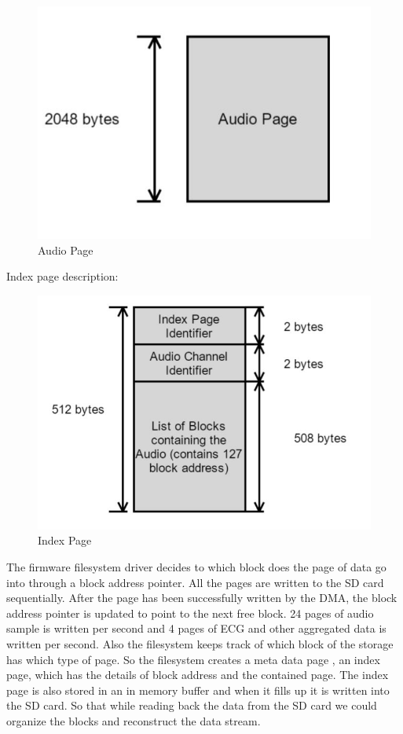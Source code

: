 \begin{figure}[h]
	\centering
	\includegraphics[scale = 0.5 ]{audio_page.JPG}
	\caption{Audio Page\label{audio_page}}
\end{figure}

Index page description: 
\begin{figure}[h]
	\centering
	\includegraphics[scale = 0.5 ]{index_page.JPG}
	\caption{Index Page\label{index_page}}
\end{figure}

The firmware filesystem driver decides to which block does the page of data go into through a block address pointer. All the pages are written to the SD card sequentially. After the page has been successfully written by the DMA, the block address pointer is updated to point to the next free block.  24 pages of audio sample is written per second and 4 pages of ECG and other aggregated data is written per second.  
Also the filesystem keeps track of which block of the storage has which type of page. So the filesystem creates a meta data page , an index page, which has the details of block address and the  contained page. The index page is also stored in an in memory buffer and when it fills up it is written into the SD card. So that while reading back the data from the SD card we could organize the blocks and reconstruct the data stream.  

